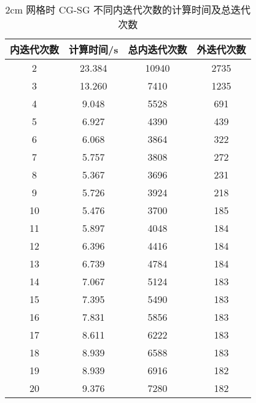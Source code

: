 \begin{datasheet}
\begin{table}
\centering
\caption{2cm 网格时 CG-SG 不同内迭代次数的计算时间及总迭代次数}
\label{tab:equsolve.iter.cg-sg.2cm}
\begin{tabular}{cccc}
\toprule
内迭代次数 & 计算时间/s & 总内迭代次数 & 外迭代次数\\
\midrule
2 & 23.384 & 10940 & 2735\\
3 & 13.260 & 7410 & 1235\\
4 & 9.048 & 5528 & 691\\
5 & 6.927 & 4390 & 439\\
6 & 6.068 & 3864 & 322\\
7 & 5.757 & 3808 & 272\\
8 & 5.367 & 3696 & 231\\
9 & 5.726 & 3924 & 218\\
10 & 5.476 & 3700 & 185\\
11 & 5.897 & 4048 & 184\\
12 & 6.396 & 4416 & 184\\
13 & 6.739 & 4784 & 184\\
14 & 7.067 & 5124 & 183\\
15 & 7.395 & 5490 & 183\\
16 & 7.831 & 5856 & 183\\
17 & 8.611 & 6222 & 183\\
18 & 8.939 & 6588 & 183\\
19 & 8.939 & 6916 & 182\\
20 & 9.376 & 7280 & 182\\
\bottomrule
\end{tabular}
\end{table}



\end{datasheet}
